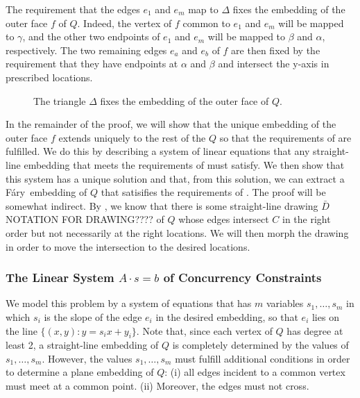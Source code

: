\documentclass{patmorin}
\newcommand{\Fary}{Fáry}
\begin{document}
The requirement that the edges $e_1$ and $e_m$ map to $\Delta$
fixes the embedding of the outer face $f$ of $Q$. Indeed, the vertex of
$f$ common to $e_1$ and $e_m$ will be mapped to $\gamma$,
and
the other two endpoints of $e_1$ and $e_m$ will be mapped
to $\beta$ and $\alpha$, respectively.  The two remaining edges $e_a$
and $e_b$ of $f$
are then fixed by the requirement that they have endpoints at $\alpha$
and $\beta$ and intersect the y-axis in prescribed locations.

\begin{figure}
   \caption{The triangle $\Delta$ fixes the embedding of the outer face of $Q$.}
\end{figure}

In the remainder of the proof, we will show that the unique embedding
of the outer face $f$ extends uniquely to the rest of the $Q$ so that
 the requirements of
 are fulfilled.  We do this by describing a system of linear equations that
any straight-line embedding that meets the requirements of 
must satisfy.  We then show that this system has a unique solution
and that, from this solution, we can extract a \Fary\ embedding of $Q$
that satisifies the requirements of .
The proof will be somewhat indirect.
%
By , we know that there is some straight-line
drawing $\bar D$ 
NOTATION FOR DRAWING????
 of $Q$
whose edges intersect $C$ in the right order but not necessarily 
at the right locations.
We will then morph the drawing in order to move the intersection
to the desired locations.


\subsubsection{The Linear System $A\cdot s=b$ of Concurrency Constraints}

We model this problem by a system of equations that has $m$ variables
$s_1,\ldots,s_m$ in which $s_i$ is the slope of the edge $e_i$ in the
desired embedding, so that $e_i$ lies on the line $\{(x,y):y=s_ix
+ y_i\}$.  Note that, since each vertex of $Q$ has degree at least 2,
a straight-line
embedding of $Q$ is completely determined by
the values of $s_1,\ldots,s_m$.
However, the values $s_1,\ldots,s_m$ must fulfill
additional conditions in order to determine a plane embedding of
$Q$: (i) all edges incident to a common vertex must meet at a common
point.
(ii) Moreover, the edges must not cross.
\end{document}

